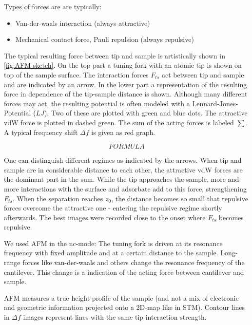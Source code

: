 Types of forces are are typically:
\begin{itemize}
 \item Van-der-waals interaction (always attractive)
 \item Mechanical contact force, Pauli repulsion (always repulsive)
\end{itemize}

The typical resulting force between tip and sample is artistically shown in \autoref{fig:AFM-sketch}. On the top part a tuning fork with an atomic tip is shown on top of the sample surface. The interaction forces $F_{ts}$ act between tip and sample and are indicated by an arrow. In the lower part a representation of the resulting force in dependence of the tip-sample distance is shown. Although many different forces may act, the resulting potential is often modeled with a Lennard-Jones-Potential ($LJ$)\cite{jones_determination_1924}. Two of these are plotted with green and blue dots. The attractive vdW force is plotted in dashed green. The sum of the acting forces is labeled $\sum$. A typical frequency shift $\Delta f$ is given as red graph. 

$$FORMULA$$

One can distinguish different regimes as indicated by the arrows. When tip and sample are in considerable distance to each other, the attractive vdW forces are the dominant part in the sum. While the tip approaches the sample, more and more interactions with the surface and adsorbate add to this force, strengthening $F_{ts}$. When the separation reaches $z_0$, the distance becomes so small that repulsive forces overcome the attractive one - entering the repulsive regime shortly afterwards. The best images were recorded close to the onset where $F_{ts}$ becomes repulsive.

We used AFM in the nc-mode: The tuning fork is driven at its resonance frequency with fixed amplitude and at a certain distance to the sample. Long-range forces like van-der-waals and others change the resonance frequency of the cantilever. This change is a indication of the acting force between cantilever and sample. 

AFM measures a true height-profile of the sample (and not a mix of electronic and geometric information projected onto a 2D-map like in STM). Contour lines in $\Delta f$ images represent lines with the same tip interaction strength.

